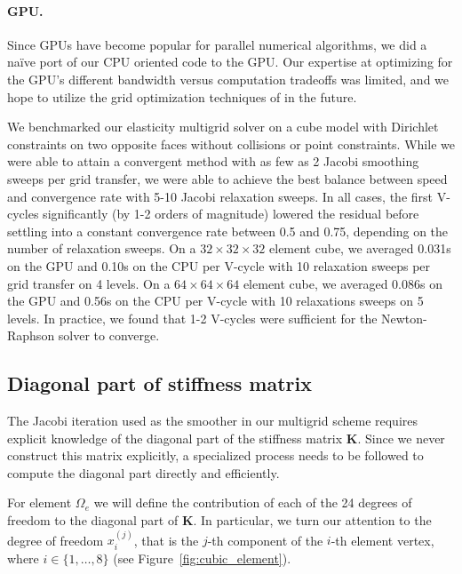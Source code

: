 \paragraph{GPU.} Since GPUs have become popular for parallel numerical algorithms, we did a
na\"{i}ve port of our CPU oriented code to the GPU. Our expertise at optimizing
for the GPU's different bandwidth versus computation tradeoffs was limited, and
we hope to utilize the grid optimization techniques of \cite{Dick:2011:CUDAFEM}
in the future.

We benchmarked our elasticity multigrid solver on a cube model with Dirichlet constraints on two opposite faces without collisions or point constraints. While we were able to attain a
convergent method with as few as 2 Jacobi smoothing sweeps per grid transfer, we were able to achieve the best balance between speed and convergence rate with 5-10 Jacobi relaxation
sweeps.  In all cases, the first V-cycles significantly (by 1-2 orders of magnitude) lowered the residual before settling into a constant convergence rate between 0.5 and 0.75, depending
on the number of relaxation sweeps.
On a $32\times32\times32$ element cube, we averaged 0.031s on the GPU and 0.10s on the CPU  per V-cycle with 10 relaxation
sweeps per grid transfer on 4 levels.  On a $64\times64\times64$ element cube, we averaged 0.086s on the GPU and 0.56s on the CPU per V-cycle with 10 relaxations sweeps on 5 levels.  In practice, we found that 1-2
V-cycles were sufficient for the Newton-Raphson solver to converge.

\subsection{Diagonal part of stiffness matrix}

The Jacobi iteration used as the smoother in our multigrid scheme requires explicit knowledge of the diagonal part of the stiffness matrix $\mathbf{K}$. Since we never construct this
matrix explicitly, a specialized process needs to be followed to compute the diagonal part directly and efficiently. 

For element $\Omega_e$ we will define the contribution of each of the 24 degrees of freedom to the diagonal
part of $\mathbf{K}$. In particular, we turn our attention to the degree of freedom $x_i^{(j)}$, that is the $j$-th component of the $i$-th element vertex, where
$i\in\{1,\ldots,8\}$ (see Figure~\ref{fig:cubic_element}). 

